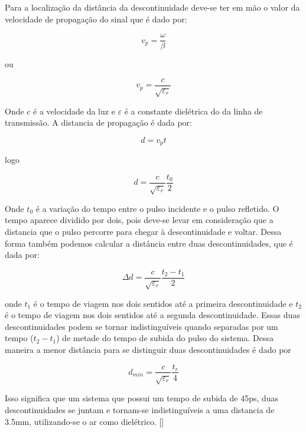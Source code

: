 Para a localização da distância da descontinuidade deve-se ter em mão o valor da velocidade de propagação do sinal que é dado por:

\begin{equation}
v_p = \frac{\omega}{\beta} 
\end{equation}
 
ou

\begin{equation}
v_p = \frac{c}{\sqrt{\varepsilon_r}}
\end{equation}

Onde $c$ é a velocidade da luz e $\varepsilon$ é a constante dielétrica do da linha de transmissão. A distancia de propagação é dada por:

\begin{equation}
d = v_pt
\end{equation}

logo 

\begin{equation}
\label{eq:distancia}
d = \frac{c}{\sqrt{\varepsilon_r}}\frac{t_0}{2}
\end{equation}

Onde $t_0$ é a variação do tempo entre o pulso incidente e o pulso refletido. O tempo aparece dividido por dois, pois deve-se levar em consideração que a distancia que o pulso percorre para chegar à descontinuidade e voltar. Dessa forma também podemos calcular a distância entre duas descontinuidades, que é dada por:

\begin{equation}
\Delta d = \frac{c}{\sqrt{\varepsilon_r}}\frac{t_2 - t_1}{2}
\end{equation}

onde $t_1$ é o tempo de viagem nos dois sentidos até a primeira descontinuidade e $t_2$ é o tempo de viagem nos dois sentidos até a segunda descontinuidade. Essas duas descontinuidades podem se tornar indistinguíveis quando separadas por um tempo ($t_2 - t_1$) de metade do tempo de subida do pulso do sistema. Dessa maneira a menor distância para se distinguir duas descontinuidades é dado por 

\begin{equation}
d_{min} = \frac{c}{\sqrt{\varepsilon_r}}\frac{t_r}{4}
\end{equation}

Isso significa que um sistema que possui um tempo de subida de 45ps, duas descontinuidades se juntam e tornam-se indistinguíveis a uma distancia de 3.5mm, utilizando-se o ar como dielétrico. [\cite{agilent}]

